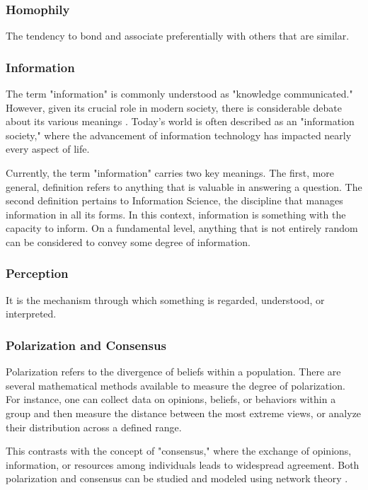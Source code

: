 \subsubsection{Homophily} The tendency to bond and associate preferentially with others that are similar. 

\subsubsection{Information} The term "information" is commonly understood as "knowledge communicated." However, given its crucial role in modern society, there is considerable debate about its various meanings \cite{Capurro_2003}. Today’s world is often described as an "information society," where the advancement of information technology has impacted nearly every aspect of life.

Currently, the term "information" carries two key meanings. The first, more general, definition refers to anything that is valuable in answering a question. The second definition pertains to Information Science, the discipline that manages information in all its forms. In this context, information is something with the capacity to inform. On a fundamental level, anything that is not entirely random can be considered to convey some degree of information. 

\subsubsection{Perception} It is the mechanism through which something is regarded, understood, or interpreted.

\subsubsection{Polarization and Consensus}

Polarization refers to the divergence of beliefs within a population. There are several mathematical methods available to measure the degree of polarization. For instance, one can collect data on opinions, beliefs, or behaviors within a group and then measure the distance between the most extreme views, or analyze their distribution across a defined range.

This contrasts with the concept of "consensus," where the exchange of opinions, information, or resources among individuals leads to widespread agreement. Both polarization and consensus can be studied and modeled using network theory \cite{Devia2022}.
